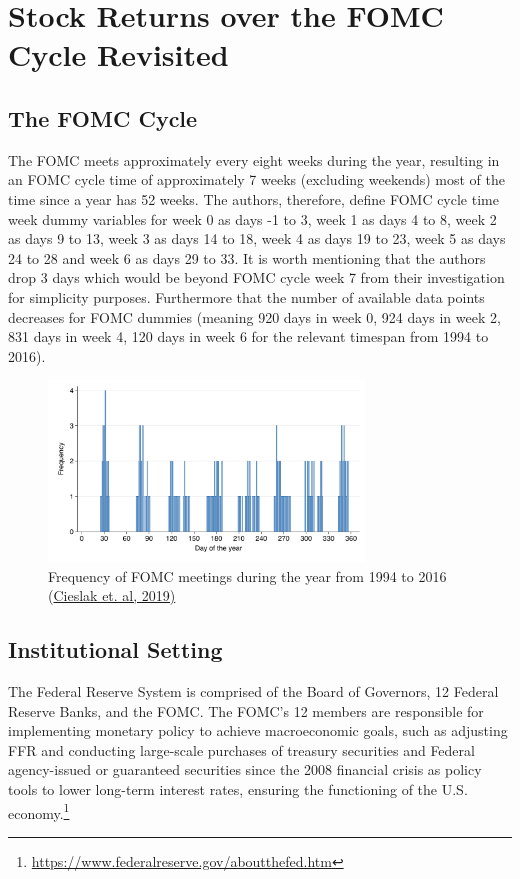 \chapter{Stock Returns over the FOMC Cycle Revisited }


\section{The FOMC Cycle}

The FOMC meets approximately every eight weeks during the year,  resulting in an FOMC cycle time of approximately 7 weeks (excluding weekends) most of the time since a year has 52 weeks. The authors, therefore, define FOMC cycle time week dummy variables for week 0 as days -1 to 3, week 1 as days 4 to 8,  week 2 as days 9 to 13, week 3 as days 14 to 18, week 4 as days 19 to 23, week 5 as days 24 to 28 and week 6 as days 29 to 33. It is worth mentioning that the authors drop 3 days which would be beyond FOMC cycle week 7 from their investigation for simplicity purposes. Furthermore that the number of available data points decreases for FOMC dummies (meaning 920 days in week 0,  924 days in week 2,  831 days in week 4,  120 days in week 6 for the relevant timespan from 1994 to 2016).

\label{cies19_fig2}
\begin{figure}[h]
    \centering
    \includegraphics[width=0.75\textwidth]{figures/cies19/fig2}
    \caption{Frequency of FOMC meetings during the year from 1994 to 2016 (\hyperref[item:cieslak_stock_2019]{Cieslak et. al,  2019)}}
\end{figure}


\section{Institutional Setting}

The Federal Reserve System is comprised of the Board of Governors, 12 Federal Reserve Banks, and the FOMC. The FOMC's 12 members are responsible for implementing monetary policy to achieve macroeconomic goals, such as adjusting FFR and conducting large-scale purchases of treasury securities and Federal agency-issued or guaranteed securities since the 2008 financial crisis as policy tools to lower long-term interest rates, ensuring the functioning of the U.S. economy.\footnote{\url{https://www.federalreserve.gov/aboutthefed.htm}} 

